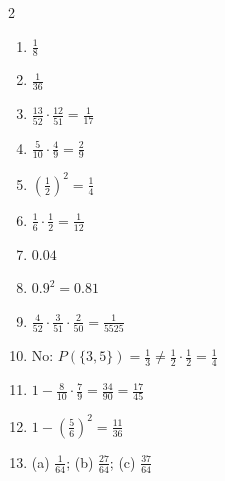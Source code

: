\documentclass[11pt]{article}
\begin{document}
\begin{keybox}
\begin{multicols}{2}
\small
\begin{enumerate}[leftmargin=*,itemsep=3pt]
  \item $\tfrac18$
  \item $\tfrac{1}{36}$
  \item $\tfrac{13}{52}\cdot\tfrac{12}{51}=\tfrac{1}{17}$
  \item $\tfrac{5}{10}\cdot\tfrac49=\tfrac29$
  \item $\left(\tfrac12\right)^2=\tfrac14$
  \item $\tfrac16\cdot\tfrac12=\tfrac{1}{12}$
  \item $0.04$
  \item $0.9^2=0.81$
  \item $\tfrac{4}{52}\cdot\tfrac{3}{51}\cdot\tfrac{2}{50}=\tfrac{1}{5525}$
  \item No: $P(\{3,5\})=\tfrac13\ne\tfrac12\cdot\tfrac12=\tfrac14$
  \item $1-\tfrac{8}{10}\cdot\tfrac79=\tfrac{34}{90}=\tfrac{17}{45}$
  \item $1-\left(\tfrac56\right)^2=\tfrac{11}{36}$
  \item (a) $\tfrac{1}{64}$; (b) $\tfrac{27}{64}$; (c) $\tfrac{37}{64}$
\end{enumerate}
\end{multicols}
\end{keybox}
\end{document}
